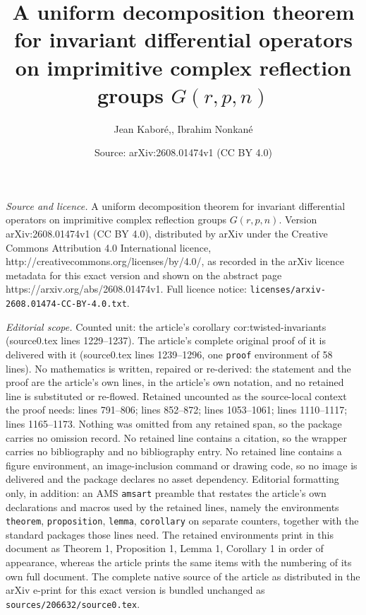 \documentclass[10pt,a4paper]{amsart}
\title{A uniform decomposition theorem for invariant differential operators on imprimitive complex reflection groups $G(r,p,n)$}
\author{Jean Kabor\'e,, Ibrahim Nonkan\'e}
\date{Source: arXiv:2608.01474v1 (CC BY 4.0)}
\begin{document}
\maketitle

\noindent\emph{Source and licence.} A uniform decomposition theorem for invariant differential operators on imprimitive complex reflection groups $G(r,p,n)$. Version arXiv:2608.01474v1 (CC BY 4.0), distributed by arXiv under the Creative Commons Attribution 4.0 International licence, http://creativecommons.org/licenses/by/4.0/, as recorded in the arXiv licence metadata for this exact version and shown on the abstract page https://arxiv.org/abs/2608.01474v1. Full licence notice: \texttt{licenses/arxiv-2608.01474-CC-BY-4.0.txt}.\par\smallskip

\noindent\textit{Editorial scope.} Counted unit: the article's corollary cor:twisted-invariants (source0.tex lines 1229--1237). The article's complete original proof of it is delivered with it (source0.tex lines 1239--1296, one \texttt{proof} environment of 58 lines). No mathematics is written, repaired or re-derived: the statement and the proof are the article's own lines, in the article's own notation, and no retained line is substituted or re-flowed.  Retained uncounted as the source-local context the proof needs: lines 791--806; lines 852--872; lines 1053--1061; lines 1110--1117; lines 1165--1173.  Nothing was omitted from any retained span, so the package carries no omission record.  No retained line contains a citation, so the wrapper carries no bibliography and no bibliography entry.  No retained line contains a figure environment, an image-inclusion command or drawing code, so no image is delivered and the package declares no asset dependency.  Editorial formatting only, in addition: an AMS \texttt{amsart} preamble that restates the article's own declarations and macros used by the retained lines, namely the environments \texttt{theorem}, \texttt{proposition}, \texttt{lemma}, \texttt{corollary} on separate counters, together with the standard packages those lines need.  The retained environments print in this document as Theorem 1, Proposition 1, Lemma 1, Corollary 1 in order of appearance, whereas the article prints the same items with the numbering of its own full document.  The complete native source of the article as distributed in the arXiv e-print for this exact version is bundled unchanged as \texttt{sources/206632/source0.tex}.
\end{document}
